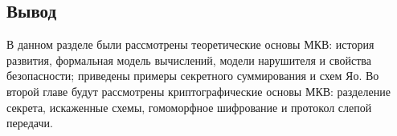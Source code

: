 \subsection{Вывод}

В данном разделе были рассмотрены теоретические основы МКВ: история развития, формальная модель вычислений, модели нарушителя и свойства безопасности; приведены примеры секретного суммирования и схем Яо. Во второй главе будут рассмотрены криптографические основы МКВ: разделение секрета, искаженные схемы, гомоморфное шифрование и протокол слепой передачи.